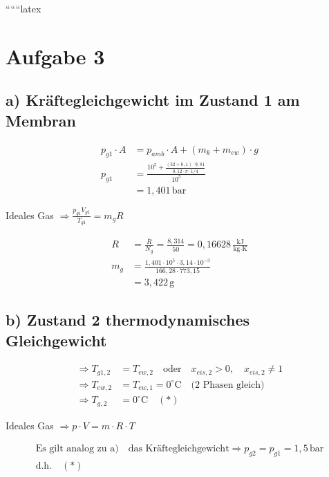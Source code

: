 
``````latex


\section*{Aufgabe 3}

\subsection*{a) Kräftegleichgewicht im Zustand 1 am Membran}

\begin{align*}
    p_{g1} \cdot A &= p_{amb} \cdot A + (m_k + m_{ew}) \cdot g \\
    p_{g1} &= \frac{10^5 + \frac{(32 + 0,1) \cdot 9,81}{0,12 \cdot \pi \cdot 1/4}}{10^5} \\
    &= 1,401 \, \text{bar}
\end{align*}

Ideales Gas $\Rightarrow \frac{p_{g1} V_{g1}}{T_{g1}} = m_g R$

\begin{align*}
    R &= \frac{\bar{R}}{N_g} = \frac{8,314}{50} = 0,16628 \, \frac{\text{kJ}}{\text{kg} \cdot \text{K}} \\
    m_g &= \frac{1,401 \cdot 10^5 \cdot 3,14 \cdot 10^{-3}}{166,28 \cdot 773,15} \\
    &= 3,422 \, \text{g}
\end{align*}

\subsection*{b) Zustand 2 thermodynamisches Gleichgewicht}

\begin{align*}
    \Rightarrow T_{g1,2} &= T_{ew,2} \quad \text{oder} \quad x_{eis,2} > 0, \quad x_{eis,2} \neq 1 \\
    \Rightarrow T_{ew,2} &= T_{ew,1} = 0^\circ \text{C} \quad \text{(2 Phasen gleich)} \\
    \Rightarrow T_{g,2} &= 0^\circ \text{C} \quad (*)
\end{align*}

Ideales Gas $\Rightarrow p \cdot V = m \cdot R \cdot T$

\begin{align*}
    \text{Es gilt analog zu a)} \quad \text{das Kräftegleichgewicht} \Rightarrow p_{g2} = p_{g1} = 1,5 \, \text{bar} \\
    \text{d.h.} \quad (*)
\end{align*}

